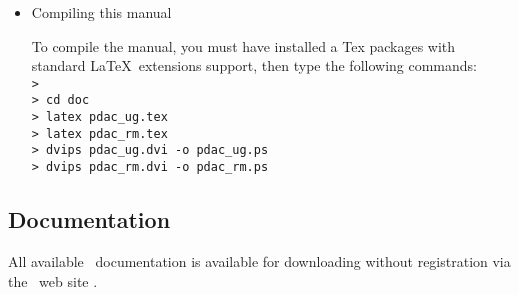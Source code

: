 \begin{itemize}
\item Compiling this manual

      To compile the manual, you must have installed a Tex packages
      with standard \LaTeX\ extensions support, 
      then type the following commands:\\
      {\tt >}\\
      {\tt > cd doc}\\
      {\tt > latex pdac\_ug.tex}\\
      {\tt > latex pdac\_rm.tex}\\
      {\tt > dvips pdac\_ug.dvi -o pdac\_ug.ps }\\
      {\tt > dvips pdac\_rm.dvi -o pdac\_rm.ps }\\

\end{itemize}

\subsection{Documentation}

All available \PDAC\ documentation is available for downloading without
registration via the \PDAC\ web site \PDACURL.

